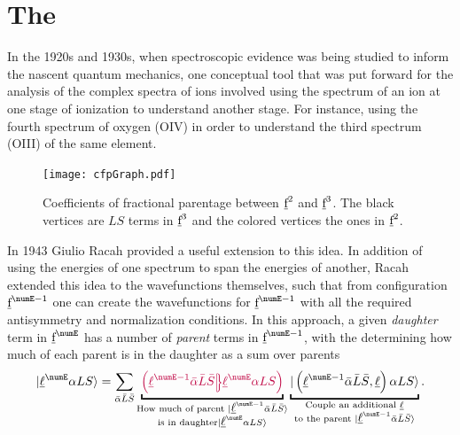\documentclass{article}
\begin{document}


\section{The \cfps} 

In the 1920s and 1930s, when spectroscopic evidence was being studied to inform the nascent quantum mechanics, one conceptual tool that was put forward for the analysis of the complex spectra of ions \cite{bacher_atomic_1934} involved using the spectrum of an ion at one stage of ionization to understand another stage.  For instance, using the fourth spectrum of oxygen (OIV) in order to understand the third spectrum (OIII) of the same element. 

\begin{figure}[h!]
\begin{center}
	\texttt{[image: cfpGraph.pdf]}
\end{center}
\caption{Coefficients of fractional parentage between $\underbar{$\text{f}$}^2$ and $\underbar{$\text{f}$}^3$. The black vertices are $LS$ terms in $\underbar{$\text{f}$}^3$ and the colored vertices the ones in $\underbar{$\text{f}$}^2$.}
\label{fig: cfpf3:f2} 
\end{figure}

In 1943 Giulio Racah \cite{racah_theory_1943} provided a useful extension to this idea. In addition of using the energies of one spectrum to span the energies of another, Racah extended this idea to the wavefunctions themselves, such that from configuration $\forb^{\numE-1}$ one can create the wavefunctions for $\forb^{\numE-1}$ with all the required antisymmetry and normalization conditions. In this approach, a given \textit{daughter} term in $\forb^{\numE}$ has a number of \textit{parent} terms in $\forb^{\numE-1}$, with the \cfps determining how much of each parent is in the daughter as a sum over parents
\begin{equation}
\ket{\lorb^\numE \alpha LS} = 
	\sum_{\bar{\alpha}\bar{L}
		\bar{S}} 
		\underbracket{\cfp{\lorb^{\numE-1}\bar{\alpha}\bar{L}\bar{S}}
			{\lorb^{\numE}\alpha{LS}}}_
		{\substack{
            \text{How much of parent }\ket{\lorb^{\numE-1}\bar{\alpha}\bar{L}\bar{S}} \\
            \text{is in daughter}\ket{\lorb^{\numE}{\alpha}{L}{S}}
            }
        }
		\underbracket{\ket{\left(\lorb^{\numE-1}\bar{\alpha}\bar{L}\bar{S},\lorb\right)\alpha{LS}}}_
		{\substack{
            \text{Couple an additional $\lorb$} \\
            \text{to the parent }\ket{\lorb^{\numE-1}\bar{\alpha}\bar{L}\bar{S}}
            }
        }.
\end{equation}
\end{document}

